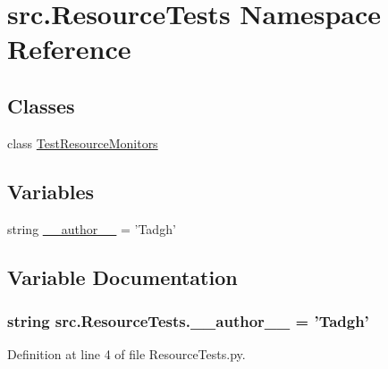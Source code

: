 \hypertarget{namespacesrc_1_1_resource_tests}{\section{src.\-Resource\-Tests Namespace Reference}
\label{namespacesrc_1_1_resource_tests}
}
\subsection*{Classes}
\begin{DoxyCompactItemize}
\item 
class \hyperlink{classsrc_1_1_resource_tests_1_1_test_resource_monitors}{Test\-Resource\-Monitors}
\end{DoxyCompactItemize}
\subsection*{Variables}
\begin{DoxyCompactItemize}
\item 
string \hyperlink{namespacesrc_1_1_resource_tests_a51565d07f3ccb7b62ed64d12a0417900}{\-\_\-\-\_\-author\-\_\-\-\_\-} = 'Tadgh'
\end{DoxyCompactItemize}


\subsection{Variable Documentation}
\hypertarget{namespacesrc_1_1_resource_tests_a51565d07f3ccb7b62ed64d12a0417900}{
\subsubsection[{\-\_\-\-\_\-author\-\_\-\-\_\-}]{\setlength{\rightskip}{0pt plus 5cm}string src.\-Resource\-Tests.\-\_\-\-\_\-author\-\_\-\-\_\- = 'Tadgh'}}\label{namespacesrc_1_1_resource_tests_a51565d07f3ccb7b62ed64d12a0417900}


Definition at line 4 of file Resource\-Tests.\-py.

